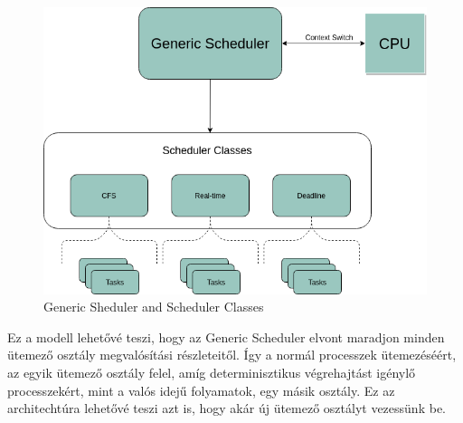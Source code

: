 \begin{figure}[h]
\centering
\includegraphics[scale=0.4]{images/genericScheduler.png}
\caption{Generic Sheduler and Scheduler Classes}
\label{fig:Generic Sheduler and Scheduler Classes}
\end{figure}

Ez a modell lehetővé teszi, hogy az Generic Scheduler elvont maradjon minden ütemező osztály megvalósítási részleteitől. Így a normál processzek ütemezéséért, az egyik ütemező osztály felel, amíg determinisztikus végrehajtást igénylő processzekért, mint a valós idejű folyamatok, egy másik osztály. Ez az architechtúra lehetővé teszi azt is, hogy akár új ütemező osztályt vezessünk be.

